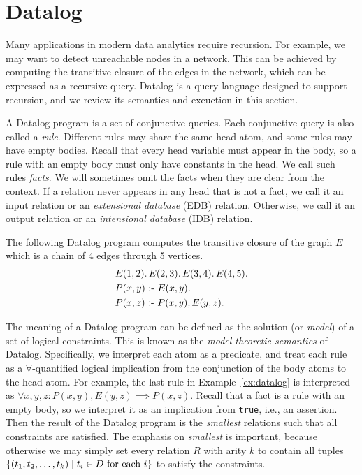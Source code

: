 \section{Datalog}
\label{sec:datalog}

Many applications in modern data analytics require recursion.
For example, we may want to detect unreachable nodes in a network.
This can be achieved by computing the transitive closure 
 of the edges in the network,
 which can be expressed as a recursive query.
Datalog is a query language designed to support recursion, 
 and we review its semantics and exeuction in this section.

A Datalog program is a set of conjunctive queries.
Each conjunctive query is also called a {\em rule}.
Different rules may share the same head atom, 
 and some rules may have empty bodies.
Recall that every head variable must appear in the body,
 so a rule with an empty body must only have constants in the head.
We call such rules {\em facts}.
We will sometimes omit the facts when they are clear from the context.
If a relation never appears in any head that is not a fact,
 we call it an input relation or an {\em extensional database} (EDB) relation.
Otherwise, we call it an output relation or an {\em intensional database} (IDB) relation.

\begin{ex}
\label{ex:datalog}
The following Datalog program computes the transitive closure of the graph $E$ 
 which is a chain of 4 edges through 5 vertices.
\begin{align*}
  &E(1, 2). \, E(2, 3). \, E(3, 4). \, E(4, 5).\\
  &P(x, y) \text{ :- } E(x, y).\\
  &P(x, z) \text{ :- } P(x, y), E(y, z).
\end{align*}
\end{ex}

The meaning of a Datalog program can be defined as the solution (or {\em model}) of 
 a set of logical constraints.
This is known as the {\em model theoretic semantics} of Datalog.
Specifically, we interpret each atom as a predicate,
 and treat each rule as a $\forall$-quantified logical implication
 from the conjunction of the body atoms to the head atom.
For example, the last rule in Example~\ref{ex:datalog} 
 is interpreted as $\forall x, y, z : P(x, y), E(y, z) \implies P(x, z)$.
Recall that a fact is a rule with an empty body,
 so we interpret it as an implication from \texttt{true}, 
 i.e., an assertion.
Then the result of the Datalog program is the {\em smallest} relations 
 such that all constraints are satisfied.
The emphasis on {\em smallest} is important, 
 because otherwise we may simply set every relation $R$ with arity $k$ 
 to contain all tuples $\{{(t_1, t_2, \ldots, t_k)}\mid{t_i \in D \text{ for each } i}\}$
 to satisfy the constraints.

